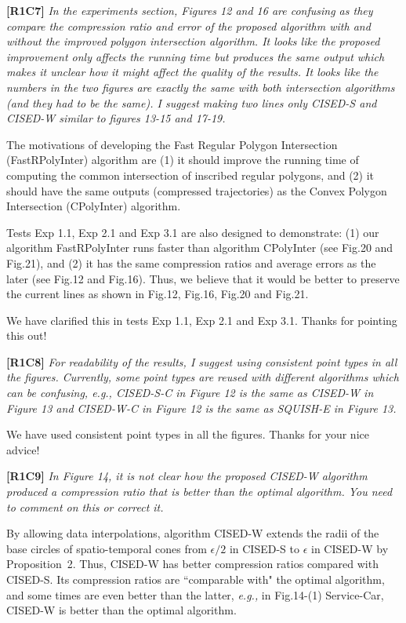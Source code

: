 \documentclass{letter}
\newcommand{\eg}{\emph{e.g.,}\xspace}
\begin{document}
{\textbf{[R1C7]} \emph{In the experiments section, Figures 12 and 16 are confusing as they compare the compression ratio and error of the proposed algorithm with and without the improved polygon intersection algorithm. It looks like the proposed improvement only affects the running time but produces the same output which makes it unclear how it might affect the quality of the results. It looks like the numbers in the two figures are exactly the same with both intersection algorithms (and they had to be the same). I suggest making two lines only CISED-S and CISED-W similar to figures 13-15 and 17-19.}

The motivations of developing the Fast Regular Polygon Intersection (FastRPolyInter) algorithm are (1) it should improve the running time of computing the common intersection of inscribed regular polygons, and (2) it should have the same outputs (compressed trajectories) as the Convex Polygon Intersection (CPolyInter) algorithm.

Tests Exp 1.1, Exp 2.1 and Exp 3.1 are also designed to demonstrate: (1) our algorithm FastRPolyInter runs faster than algorithm CPolyInter (see Fig.20 and Fig.21), and (2) it has the same compression ratios and average errors as the later (see Fig.12 and Fig.16).
%
Thus, we believe that it would be better to preserve the current lines as shown in Fig.12, Fig.16, Fig.20 and Fig.21. %

We have clarified this in tests Exp 1.1, Exp 2.1 and Exp 3.1. Thanks for pointing this out!

\textbf{[R1C8]} \emph{For readability of the results, I suggest using consistent point types in all the figures. Currently, some point types are reused with different algorithms which can be confusing, e.g., CISED-S-C in Figure 12 is the same as CISED-W in Figure 13 and CISED-W-C in Figure 12 is the same as SQUISH-E in Figure 13.}

We have used consistent point types in all the figures. Thanks for your nice advice!

\textbf{[R1C9]} \emph{In Figure 14, it is not clear how the proposed CISED-W algorithm produced a compression ratio that is better than the optimal algorithm. You need to comment on this or correct it.}

By allowing data interpolations, algorithm CISED-W extends the radii of the base circles of spatio-temporal cones from $\epsilon/2$ in CISED-S to $\epsilon$ in CISED-W by Proposition~2. Thus, CISED-W has better compression ratios compared with CISED-S. Its compression ratios are ``comparable with" the optimal algorithm, and some times are even better than the latter, \eg in Fig.14-(1) Service-Car, CISED-W is better than the optimal algorithm.


}
\end{document}
